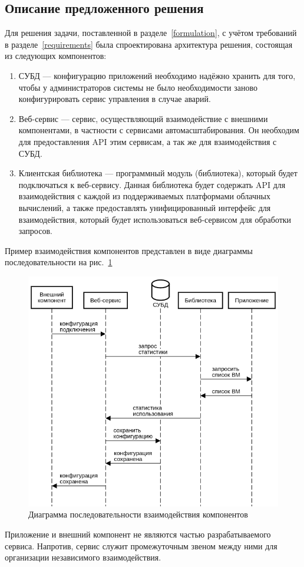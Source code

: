 \subsection{Описание предложенного решения}
Для решения задачи, поставленной в разделе~\ref{formulation}, с учётом требований в разделе~\ref{requirements} была спроектирована архитектура решения, состоящая из следующих компонентов:
\begin{enumerate}
    \item СУБД --- конфигурацию приложений необходимо надёжно хранить для того, чтобы у администраторов системы не было необходимости заново конфигурировать сервис управления в случае аварий.
    \item Веб-сервис --- сервис, осуществляющий взаимодействие с внешними компонентами, в частности с сервисами автомасштабирования. 
    Он необходим для предоставления API этим сервисам, а так же для взаимодействия с СУБД.
    \item Клиентская библиотека --- программный модуль (библиотека), который будет подключаться к веб-сервису.
    Данная библиотека будет содержать API для взаимодействия с каждой из поддерживаемых платформами облачных вычислений, а также предоставлять унифицированный интерфейс для взаимодействия, который будет использоваться веб-сервисом для обработки запросов.
\end{enumerate}

Пример взаимодействия компонентов представлен в виде диаграммы последовательности на рис.~\ref{architecture-sequence}
\begin{figure}[h]
    \centering
    \label{architecture-sequence}
    \includegraphics[width=14cm]{img/architecture-sequence.png}
    \caption{Диаграмма последовательности взаимодействия компонентов}
\end{figure}

Приложение и внешний компонент не являются частью разрабатываемого сервиса.
Напротив, сервис служит промежуточным звеном между ними для организации независимого взаимодействия.